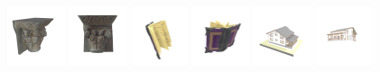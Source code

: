 \begin{figure}[htbp]
  \includegraphics[width=0.15\textwidth]{images/data/samples/4.1.jpeg}\hspace{0.01\textwidth}%
  \includegraphics[width=0.15\textwidth]{images/data/samples/4.2.jpeg}\hfill
  \includegraphics[width=0.15\textwidth]{images/data/samples/5.1.jpeg}\hspace{0.01\textwidth}%
  \includegraphics[width=0.15\textwidth]{images/data/samples/5.2.jpeg}\hfill
  \includegraphics[width=0.15\textwidth]{images/data/samples/6.1.jpeg}\hspace{0.01\textwidth}%
  \includegraphics[width=0.15\textwidth]{images/data/samples/6.2.jpeg}\\
  \vspace{2mm}


\end{figure}
